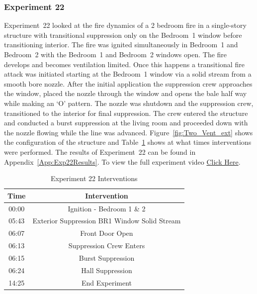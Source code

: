 \documentclass[12pt,oneside]{book}
\begin{document}
\FloatBarrier

\subsubsection{Experiment 22}
Experiment~22 looked at the fire dynamics of a 2 bedroom fire in a single-story structure with transitional suppression only on the Bedroom~1 window before transitioning interior. The fire was ignited simultaneously in Bedroom~1 and Bedroom~2 with the Bedroom~1 and Bedroom~2 windows open. The fire develops and becomes ventilation limited. Once this happens a transitional fire attack was initiated starting at the Bedroom~1 window via a solid stream from a smooth bore nozzle. After the initial application the suppression crew approaches the window, placed the nozzle through the window and opens the bale half way while making an `O' pattern. The nozzle was shutdown and the suppression crew, transitioned to the interior for final suppression. The crew entered the structure and conducted a burst suppression at the living room and proceeded down with the nozzle flowing while the line was advanced. Figure~\ref{fig:Two_Vent_ext} shows the configuration of the structure and Table~\ref{Table:Exp22Interventions} shows at what times interventions were performed. The results of Experiment~22 can be found in Appendix~\ref{App:Exp22Results}. To view the full experiment video \href{https://player.vimeo.com/video/170499624?autoplay=1}{Click Here}.

\begin{table}[H]
	\centering
	\caption{Experiment 22 Interventions}
	\begin{tabular}{|c|c|} 
		\hline
		Time & Intervention \\ \hline \hline
		00:00 & Ignition - Bedroom 1 \& 2 \\ \hline
		05:43 & Exterior Suppression BR1 Window Solid Stream \\ \hline
		06:07 & Front Door Open \\ \hline
		06:13 & Suppression Crew Enters\\ \hline
		06:15 & Burst Suppression \\ \hline 
		06:24 & Hall Suppression \\ \hline
		14:25 & End Experiment\\ \hline
	\end{tabular}
	\label{Table:Exp22Interventions}
\end{table}

\clearpage
\end{document}
